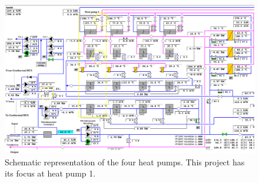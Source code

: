\vspace{-1.3cm}
\begin{figure}[H]
	\centering
		\includegraphics[width=1.27\textwidth, angle = 270]{appendices/pictures/Central_Vestermark_MODIFIED_SVG.pdf}
		\caption{Schematic representation of the four heat pumps. This project has its focus at heat pump 1.}
	\label{fig:vestermark}
\end{figure}